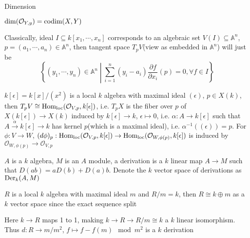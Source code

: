 \documentclass[main]{subfiles}
\begin{document}
\begin{example}

\end{example}

\begin{definition}
Dimension
\end{definition}

\begin{proposition}
$\dim(\mathcal O_{Y,y})=\operatorname{codim}(X,Y)$
\end{proposition}

Classically, ideal $I\subseteq k[x_1,\cdots,x_n]$ corresponds to an algebraic set $V(I)\subseteq\mathbb A^n$, $p=(a_1,\cdots,a_n)\in\mathbb A^n$, then tangent space $T_pV$(view as embedded in $\mathbb A^n$) will just be
\[\left\{(y_1,\cdots,y_n)\in\mathbb A^n\middle|\sum_{i=1}^n(y_i-a_i)\frac{\partial f}{\partial x_i}(p)=0,\forall f\in I\right\}\]

\begin{definition}
$k[\epsilon]=k[x]/(x^2)$ is a local $k$ algebra with maximal ideal $(\epsilon)$, $p\in X(k)$, then $T_pV\cong\operatorname{Hom}_{\text{loc}}(\mathcal O_{V,p},k[\epsilon])$, i.e. $T_pX$ is the fiber over $p$ of $X(k[\epsilon])\to X(k)$ induced by $k[\epsilon]\to k$, $\epsilon\mapsto0$, i.e. $\alpha:A\to k[\epsilon]$ such that $A\xrightarrow\alpha k[\epsilon]\to k$ has kernel $p$(which is a maximal ideal), i.e. $\alpha^{-1}((\epsilon))=p$. For $\phi: V\to W$, $(d\phi)_p:\operatorname{Hom}_{\text{loc}}(\mathcal O_{V,p},k[\epsilon])\to\operatorname{Hom}_{\text{loc}}(\mathcal O_{W,\phi(p)},k[\epsilon])$ is induced by $\mathcal O_{W,\phi(p)}\to\mathcal O_{V,p}$
\end{definition}

\begin{definition}
$A$ is a $k$ algebra, $M$ is an $A$ module, a derivation is a $k$ linear map $A\to M$ such that $D(ab)=aD(b)+D(a)b$. Denote the $k$ vector space of derivations as $\operatorname{Der}_k(A,M)$
\end{definition}

\begin{example}
$R$ is a local $k$ algebra with maximal ideal $m$ and $R/m=k$, then $R\cong k\oplus m$ as a $k$ vector space since the exact sequence split
\begin{center}
\end{center}
Here $k\to R$ maps 1 to 1, making $k\to R\to R/m\cong k$ a $k$ linear isomorphism. Thus $d:R\to m/m^2$, $f\mapsto f-f(m)\mod m^2$ is a $k$ derivation
\end{example}
\end{document}
